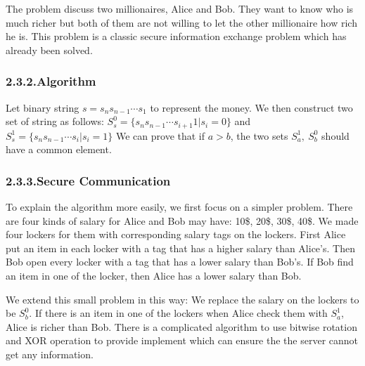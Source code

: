 \documentclass{article}
\begin{document}
\noindent{}The problem discuss two millionaires, Alice and Bob. They want to know who is much richer but both of them are not willing to let the other millionaire how rich he is. This problem is a classic secure information exchange problem which has already been solved.%

\subsubsection{2.3.2.\hspace*{0.5em}Algorithm}\label{sec-algorithm}%

\noindent{}Let binary string $s=s_ns_{n-1}\cdots s_1$ to represent the money. We then construct two set of string as follows:
$S_s^0=\{s_ns_{n-1}\cdots s_{i+1}1|s_i=0\}$
 and $S_s^1=\{s_ns_{n-1}\cdots s_{i}|s_i=1\}$
We can prove that if $a>b$, the two sets $S_a^1,\ S_b^0$ should have a common element.%

\subsubsection{2.3.3.\hspace*{0.5em}Secure Communication}\label{sec-secure-communication}%

\noindent{}To explain the algorithm more easily, we first focus on a simpler problem. There are four kinds of salary for Alice and Bob may have: 10\$, 20\$, 30\$, 40\$. We made four lockers for them with corresponding salary tags on the lockers. First Alice put an item in each locker with a tag that has a higher salary than Alice's. Then Bob open every locker with a tag that has a lower salary than Bob's. If Bob find an item in one of the locker, then Alice has a lower salary than Bob.%

We extend this small problem in this way: We replace the salary on the lockers to be $S_b^0$.
If there is an item in one of the lockers when Alice check them with $S_a^1$, Alice is richer than Bob.
There is a complicated algorithm to use bitwise rotation and XOR operation to provide implement which can ensure the the server cannot get any information.%
\end{document}
